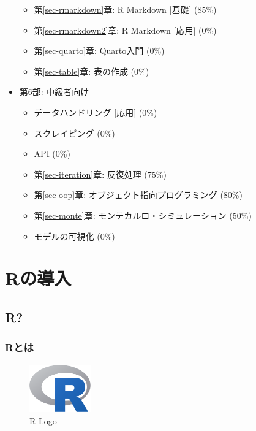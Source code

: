 \documentclass[
  a4paper,
  pandoc,
  ja=standard,
  jafont=haranoaji]{bxjsbook}
\providecommand{\tightlist}{%
  \setlength{\itemsep}{0pt}\setlength{\parskip}{0pt}}
\begin{document}
\begin{itemize}
  \begin{itemize}
  \tightlist
  \item
    第\ref{sec-rmarkdown}章: R Markdown {[}基礎{]} (85\%)
  \item
    第\ref{sec-rmarkdown2}章: R Markdown {[}応用{]} (0\%)
  \item
    第\ref{sec-quarto}章: Quarto入門 (0\%)
  \item
    第\ref{sec-table}章: 表の作成 (0\%)
  \end{itemize}
\item
  第6部: 中級者向け

  \begin{itemize}
  \tightlist
  \item
    データハンドリング {[}応用{]} (0\%)
  \item
    スクレイピング (0\%)
  \item
    API (0\%)
  \item
    第\ref{sec-iteration}章: 反復処理 (75\%)
  \item
    第\ref{sec-oop}章: オブジェクト指向プログラミング (80\%)
  \item
    第\ref{sec-monte}章: モンテカルロ・シミュレーション (50\%)
  \item
    モデルの可視化 (0\%)
  \end{itemize}
\end{itemize}

\part{Rの導入}

\hypertarget{sec-aboutr}{%
\chapter{R?}\label{sec-aboutr}}

\hypertarget{WhatIsR}{%
\section{Rとは}\label{WhatIsR}}

\begin{figure}

{\centering \includegraphics[width=1.04167in,height=\textheight]{./Figs/AboutR/Rlogo.png}

}

\caption{\label{fig-rlogo}R Logo}

\end{figure}
\end{document}
